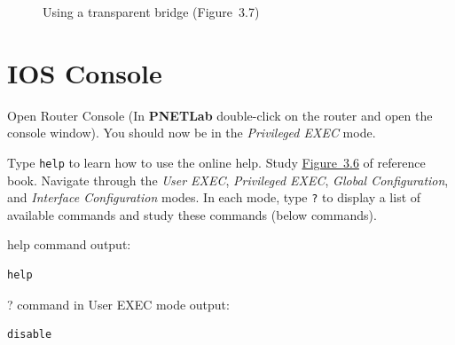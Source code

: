 \documentclass{UTNetLab}
\begin{document}
\begin{figure}[H]
	\centering
	\caption{Using a transparent bridge (Figure~3.7)}\label{fig:3.7}
\end{figure}


\section{IOS Console}
    Open Router Console (In \textbf{PNETLab} double-click on the
 router and open the console window).
    You should now be in the \textit{Privileged EXEC} mode.

    Type \lstinline[language={cisco}]{help} to learn how to use the online help.
    Study \hyperref[fig:3.6]{Figure~3.6} of reference book. Navigate through the \textit{User EXEC}, \textit{Privileged EXEC}, \textit{Global Configuration}, and \textit{Interface Configuration} modes. In each mode, type \lstinline[language={cisco}]{?} to display a list of available commands and study these commands (below commands). \newline
    
    help command output:
    
    \begin{lstlisting}[frame=trBL]
    help
    \end{lstlisting}

	? command in User EXEC mode output:
	
	\begin{lstlisting}[frame=trBL]
	disable
	\end{lstlisting}
	
\end{document}
